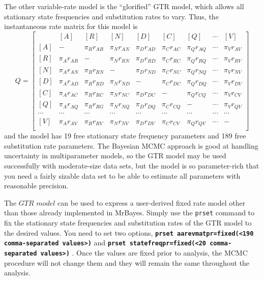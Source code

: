 \documentclass[12pt]{book}
\newcommand{\ttt}[1]{\texttt{#1} }
\newcommand{\tb}[1]{\texttt{\textbf{#1}} }
\begin{document}
The other variable-rate model is the ``glorified'' GTR model, which allows all stationary state
frequencies and substitution rates to vary. Thus, the instantaneous rate matrix for this model is
\[
Q=\begin{bmatrix}
    & [A] & [R] & [N] & [D] & [C] & [Q] & \cdots & [V]\\ 
 [A]& - & \pi_{R} r_{AR}& \pi_{N} r_{AN} & \pi_{D} r_{AD}& \pi_{C} r_{AC}& \pi_{Q} r_{AQ} & \cdots & \pi_V 
r_{AV}\\ 
 [R]& \pi_{A} r_{AR} &- &  \pi_{N}  r_{RN}& \pi_{D} r_{RD}& \pi_{C} r_{RC}& \pi_{Q} r_{RQ} & \cdots & \pi_V 
r_{RV}\\ 
 [N]& \pi_{A} r_{AN}&\pi_{R} r_{RN}&- &   \pi_{D} r_{ND}& \pi_{C} r_{NC}& \pi_{Q} r_{NQ} & \cdots & \pi_V 
r_{NV}\\ 
 [D]& \pi_{A} r_{AD} &\pi_{R} r_{RD} &  \pi_{N} r_{ND}&- &  \pi_{C} r_{DC}& \pi_{Q} r_{DQ} & \cdots & \pi_V 
r_{DV}\\ 
 [C]& \pi_{A} r_{AC} &\pi_{R} r_{RC} &  \pi_{N} r_{NC}&  \pi_{D} r_{DC}&- & \pi_{Q} r_{CQ} & \cdots & \pi_V 
r_{CV}\\ 
 [Q]& \pi_{A} r_{AQ} &\pi_{R} r_{RG} &  \pi_{N} r_{NQ}&  \pi_{D} r_{DQ}& \pi_{C} r_{CQ} &- & \cdots & \pi_V 
r_{QV}\\  
 \cdots& \cdots& \cdots& \cdots& \cdots& \cdots& \cdots& \cdots& \cdots\\
 [V]& \pi_{A} r_{AV} &\pi_{R} r_{RV} &  \pi_{N} r_{NV}&  \pi_{D} r_{DV}& \pi_{C} r_{CV} &\pi_Q r_{QV}& 
\cdots &- \\ 
\end{bmatrix}
\]
and the model has 19 free stationary state frequency parameters and 189 free substitution rate
parameters. The Bayesian MCMC approach is good at handling uncertainty in multiparameter models, so
the GTR model may be used successfully with moderate-size data sets, but the model is so
parameter-rich that you need a fairly sizable data set to be able to estimate all parameters with
reasonable precision.

The $GTR$ $model$ can be used to express a user-derived fixed rate model other than those already
implemented in MrBayes. Simply use the \ttt{prset} command to fix the stationary state frequencies
and substitution rates of the GTR model to the desired values. You need to set two options,
\tb{prset aarevmatpr=fixed(<190 comma-separated values>)} and \tb{prset statefreqpr=fixed(<20
comma-separated values>)}. Once the values are fixed prior to analysis, the MCMC procedure will not
change them and they will remain the same throughout the analysis.
\end{document}
